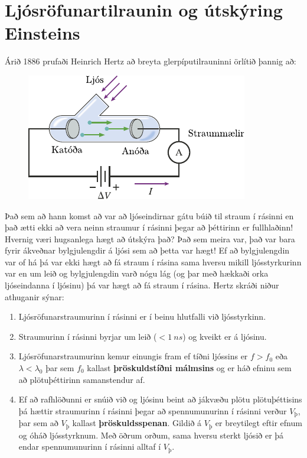 \ifdefined \wholebook \else\documentclass[oneside]{book}\usepackage{EdlBook}\graphicspath{{figures/}}
\begin{document}
\section{Ljósröfunartilraunin og útskýring Einsteins}

Árið 1886 prufaði Heinrich Hertz að breyta glerpíputilrauninni örlítið þannig að:

\begin{figure}[H]
    \centering
    \includegraphics{figures/photoelectric1.pdf}
\end{figure}

Það sem að hann komst að var að ljóseindirnar gátu búið til straum í rásinni en það ætti ekki að vera neinn straumur í rásinni þegar að þéttirinn er fullhlaðinn! Hvernig væri hugsanlega hægt að útskýra það? Það sem meira var, það var bara fyrir ákveðnar bylgjulengdir á ljósi sem að þetta var hægt! Ef að bylgjulengdin var of há þá var ekki hægt að fá straum í rásina sama hversu mikill ljósstyrkurinn var en um leið og bylgjulengdin varð nógu lág (og þar með hækkaði orka ljóseindanna í ljósinu) þá var hægt að fá straum í rásina. Hertz skráði niður athuganir sýnar:

\begin{enumerate}[label =  (\arabic*)]
    \item Ljósröfunarstraumurinn í rásinni er í beinu hlutfalli við ljósstyrkinn.
    
    \item Straumurinn í rásinni byrjar um leið ($< \SI{1}{ns}$) og kveikt er á ljósinu.
    
    \item Ljósröfunarstraumurinn kemur einungis fram ef tíðni ljóssins er $f > f_0$ eða $\lambda < \lambda_0$ þar sem $f_0$ kallast \textbf{þröskuldstíðni málmsins} og er háð efninu sem að plötuþéttirinn samanstendur af.
    
    \item Ef að rafhlöðunni er snúið við og ljósinu beint að jákvæðu plötu plötuþéttisins þá hættir straumurinn í rásinni þegar að spennumunurinn í rásinni verður $V_{\text{þ}}$, þar sem að $V_{\text{þ}}$ kallast \textbf{þröskuldsspenan}. Gildið á $V_{\text{þ}}$ er breytilegt eftir efnum og óháð ljósstyrknum. Með öðrum orðum, sama hversu sterkt ljósið er þá endar spennumunurinn í rásinni alltaf í $V_{\text{þ}}$.
\end{enumerate}
\end{document}
